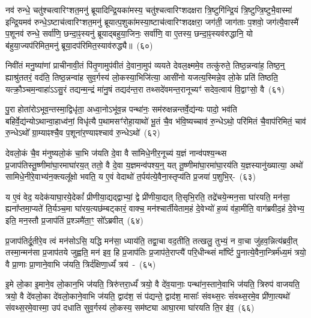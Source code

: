 नव॑ रुन्धे॒ चतु॑श्चत्वारिꣳशत॒मनु॑ ब्रूयादिन्द्रि॒यका॑मस्य॒ चतु॑श्चत्वारिꣳशद\-क्षरा त्रि॒ष्टुगि॑न्द्रि॒यं त्रि॒ष्टुप्त्रि॒ष्टुभै॒वास्मा॑ इन्द्रि॒यमव॑ रुन्धे॒\-ऽष्टाच॑त्वारिꣳशत॒मनु॑ ब्रूयात्प॒शुका॑मस्या॒ष्टाच॑त्वारिꣳशद\-क्षरा॒ जग॑ती॒ जाग॑ताः प॒शवो॒ जग॑त्यै॒वास्मै॑ प॒शूनव॑ रुन्धे॒ सर्वा॑णि॒ छन्दा॒ꣴ॒स्यनु॑ ब्रूयाद्बहुया॒जिनः॒ सर्वा॑णि॒ वा ए॒तस्य॒ छन्दा॒ꣴ॒स्यव॑रुद्धानि॒ यो ब॑हुया॒ज्यप॑रिमित॒मनु॑ ब्रूया॒दप॑रिमित॒स्याव॑रुद्ध्यै॥~(६०)\ip

{\anuvakamend[{का॒मये॑त॒ प्रति॑ष्ठित्यै प॒शून्थ्स॒प्तच॑त्वारिꣳशच्च}]}%

निवी॑तं मनु॒ष्या॑णां प्राचीनावी॒तं पि॑तृ॒णामुप॑वीतं दे॒वाना॒मुप॑ व्ययते देवल॒क्ष्ममे॒व तत्कु॑रुते॒ तिष्ठ॒न्नन्वा॑ह॒ तिष्ठ॒न्॒ ह्याश्रु॑ततरं॒ वद॑ति॒ तिष्ठ॒न्नन्वा॑ह सुव॒र्गस्य॑ लो॒कस्या॒भिजि॑त्या॒ आसी॑नो यजत्य॒स्मिन्ने॒व लो॒के प्रति॑ तिष्ठति॒ यत्क्रौ॒ञ्चम॒न्वाहा॑\-ऽऽ\-सु॒रं तद्यन्म॒न्द्रं मा॑नु॒षं तद्यद॑न्त॒रा तथ्सदे॑वमन्त॒रानूच्यꣳ॑ सदेव॒त्वाय॑ वि॒द्वाꣳसो॒ वै~(६१)\ip

पु॒रा होता॑रो\-ऽभूव॒न्तस्मा॒द्विधृ॑ता॒ अध्वा॒नो\-ऽभू॑व॒न्न पन्था॑नः॒ सम॑रुक्षन्नन्तर्वे॒द्य॑न्यः पादो॒ भव॑ति बहिर्वे॒द्य॑न्यो\-ऽथान्वा॒हाध्व॑नां॒ विधृ॑त्यै प॒थामसꣳ॑रोहा॒याथो॑ भू॒तं चै॒व भ॑वि॒ष्यच्चाव॑ रु॒न्धे\-ऽथो॒ परि॑मितं चै॒वाप॑रिमितं॒ चाव॑ रु॒न्धे\-ऽथो᳚ ग्रा॒म्याꣴश्चै॒व प॒शूना॑र॒ण्याꣴश्चाव॑ रु॒न्धे\-ऽथो॑~(६२)\ip

देवलो॒कं चै॒व म॑नुष्यलो॒कं चा॒भि ज॑यति दे॒वा वै सा॑मिधे॒नीर॒नूच्य॑ य॒ज्ञं नान्व॑पश्य॒न्थ्स प्र॒जा\-प॑तिस्तू॒ष्णीमा॑घा॒र\-माघा॑र\-य॒त् ततो॒ वै दे॒वा य॒ज्ञमन्व॑पश्य॒न्॒ यत् तू॒ष्णीमा॑\-घा॒रमा॑\-घा॒रय॑ति य॒ज्ञस्यानु॑\-ख्यात्या॒ अथो॑ सामिधे॒नीरे॒वाभ्य॑न॒क्त्यलू᳚क्षो भवति॒ य ए॒वं वेदाथो॑ त॒र्पय॑त्ये॒वैना॒स्तृप्य॑ति प्र॒जया॑ प॒शुभि॒र्-~(६३)\ip

य ए॒वं वेद॒ यदेक॑याघा॒रये॒देकां᳚ प्रीणीया॒द्यद्द्वाभ्यां॒ द्वे प्री॑णीया॒द्यत् ति॒सृभि॒रति॒ तद्रे॑चये॒न्मन॒सा घा॑रयति॒ मन॑सा॒ ह्यना᳚प्तमा॒प्यते॑ ति॒र्यञ्च॒मा घा॑रय॒त्यछ॑म्बट्कारं॒ वाक्च॒ मन॑श्चार्तीयेताम॒हं दे॒वेभ्यो॑ ह॒व्यं व॑हा॒मीति॒ वाग॑ब्रवीद॒हं दे॒वेभ्य॒ इति॒ मन॒स्तौ प्र॒जा\-प॑तिं प्र॒श्ञमै॑ता॒ꣳ॒ सो᳚\-ऽब्रवीत्~(६४)\ip

प्र॒जा\-प॑तिर्दू॒तीरे॒व त्वं मन॑सो\-ऽसि॒ यद्धि मन॑सा॒ ध्याय॑ति॒ तद्वा॒चा वद॒तीति॒ तत्खलु॒ तुभ्यं॒ न वा॒चा जु॑हव॒न्नित्य॑ब्रवी॒त् तस्मा॒न्मन॑सा प्र॒जा\-प॑तये जुह्वति॒ मन॑ इव॒ हि प्र॒जा\-प॑तिः प्र॒जा\-प॑ते॒राप्त्यै॑ परि॒धीन्थ्सं मा᳚र्ष्टि पु॒नात्ये॒वैना॒न्त्रिर्म॑ध्य॒मं त्रयो॒ वै प्रा॒णाः प्रा॒णाने॒वाभि ज॑यति॒ त्रिर्द॑क्षिणा॒र्ध्यं॑ त्रय॑~-~(६५)\ip

इ॒मे लो॒का इ॒माने॒व लो॒कान॒भि ज॑यति॒ त्रिरु॑त्तरा॒र्ध्यं॑ त्रयो॒ वै दे॑व॒यानाः॒ पन्था॑न॒स्ताने॒वाभि ज॑यति॒ त्रिरुप॑ वाजयति॒ त्रयो॒ वै दे॑वलो॒का दे॑वलो॒काने॒वाभि ज॑यति॒ द्वाद॑श॒ सं प॑द्यन्ते॒ द्वाद॑श॒ मासाः᳚ संवथ्स॒रः सं॑वथ्स॒रमे॒व प्री॑णा॒त्यथो॑ संवथ्स॒रमे॒वास्मा॒ उप॑ दधाति सुव॒र्गस्य॑ लो॒कस्य॒ सम॑ष्ट्या आघा॒रमा घा॑रयति ति॒र इ॑व॒~(६६)\ip

